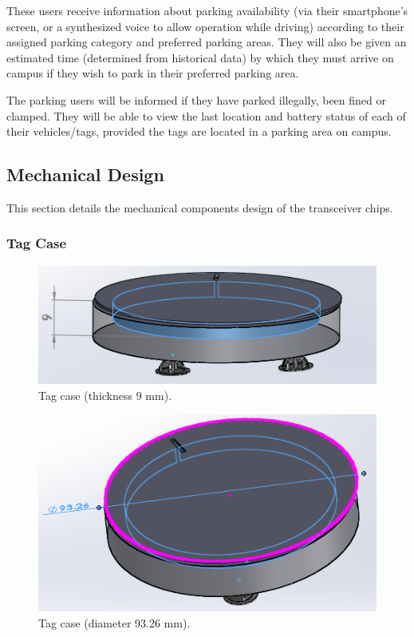 These users receive information about parking availability (via their smartphone's screen, or a synthesized voice to allow operation while driving) according to their assigned parking category and preferred parking areas. They will also be given an estimated time (determined from historical data) by which they must arrive on campus if they wish to park in their preferred parking area.

The parking users will be informed if they have parked illegally, been fined or clamped. They will be able to view the last location and battery status of each of their vehicles/tags, provided the tags are located in a parking area on campus.

\newpage
\subsection{Mechanical Design} 
This section details the mechanical components design of the transceiver chips.

\subsubsection{Tag Case}
\begin{figure}[H]
\begin{center}
\includegraphics[scale=0.6]{data/mechanical/1.png}
\caption{Tag case (thickness 9 mm).}
\label{fig:mech-1}
\end{center}
\end{figure}

\begin{figure}[H]
\begin{center}
\includegraphics[scale=0.6]{data/mechanical/2.png}
\caption{Tag case (diameter 93.26 mm).}
\label{fig:mech-1}
\end{center}
\end{figure}

